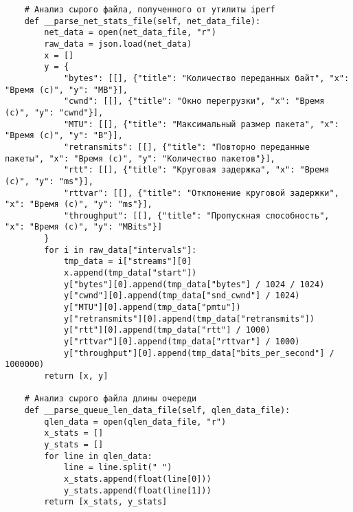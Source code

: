 \begin{verbatim}
    # Анализ сырого файла, полученного от утилиты iperf
    def __parse_net_stats_file(self, net_data_file):
        net_data = open(net_data_file, "r")
        raw_data = json.load(net_data)
        x = []
        y = {
            "bytes": [[], {"title": "Количество переданных байт", "x": "Время (с)", "y": "MB"}],
            "cwnd": [[], {"title": "Окно перегрузки", "x": "Время (с)", "y": "cwnd"}],
            "MTU": [[], {"title": "Максимальный размер пакета", "x": "Время (с)", "y": "B"}],
            "retransmits": [[], {"title": "Повторно переданные пакеты", "x": "Время (с)", "y": "Количество пакетов"}],
            "rtt": [[], {"title": "Круговая задержка", "x": "Время (с)", "y": "ms"}],
            "rttvar": [[], {"title": "Отклонение круговой задержки", "x": "Время (с)", "y": "ms"}],
            "throughput": [[], {"title": "Пропускная способность", "x": "Время (с)", "y": "MBits"}]
        }
        for i in raw_data["intervals"]:
            tmp_data = i["streams"][0]
            x.append(tmp_data["start"])
            y["bytes"][0].append(tmp_data["bytes"] / 1024 / 1024)
            y["cwnd"][0].append(tmp_data["snd_cwnd"] / 1024)
            y["MTU"][0].append(tmp_data["pmtu"])
            y["retransmits"][0].append(tmp_data["retransmits"])
            y["rtt"][0].append(tmp_data["rtt"] / 1000)
            y["rttvar"][0].append(tmp_data["rttvar"] / 1000)
            y["throughput"][0].append(tmp_data["bits_per_second"] / 1000000)
        return [x, y]

    # Анализ сырого файла длины очереди
    def __parse_queue_len_data_file(self, qlen_data_file):
        qlen_data = open(qlen_data_file, "r")
        x_stats = []
        y_stats = []
        for line in qlen_data:
            line = line.split(" ")
            x_stats.append(float(line[0]))
            y_stats.append(float(line[1]))
        return [x_stats, y_stats]
\end{verbatim}
